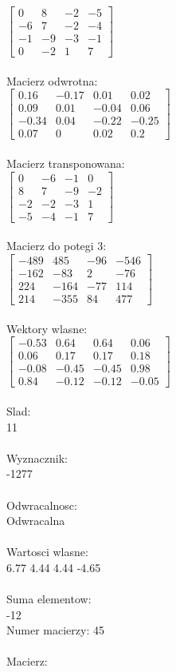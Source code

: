 \documentclass[a4paper,12pt]{article}
\begin{document}
$\begin{bmatrix} 0&8&-2&-5\\-6&7&-2&-4\\-1&-9&-3&-1\\0&-2&1&7 \end{bmatrix}$
\\
\\
Macierz odwrotna:\\

$\begin{bmatrix} 0.16&-0.17&0.01&0.02\\0.09&0.01&-0.04&0.06\\-0.34&0.04&-0.22&-0.25\\0.07&0&0.02&0.2 \end{bmatrix}$
\\
\\
Macierz transponowana:\\

$\begin{bmatrix} 0&-6&-1&0\\8&7&-9&-2\\-2&-2&-3&1\\-5&-4&-1&7 \end{bmatrix}$
\\
\\
Macierz do potegi 3:\\

$\begin{bmatrix} -489&485&-96&-546\\-162&-83&2&-76\\224&-164&-77&114\\214&-355&84&477 \end{bmatrix}$
\\
\\
Wektory wlasne:\\

$\begin{bmatrix} -0.53&0.64&0.64&0.06\\0.06&0.17&0.17&0.18\\-0.08&-0.45&-0.45&0.98\\0.84&-0.12&-0.12&-0.05 \end{bmatrix}$
\\
\\
Slad:\\
11
\\
\\
Wyznacznik:\\
-1277
\\
\\
Odwracalnosc:\\
Odwracalna
\\
\\
Wartosci wlasne:\\
6.77 4.44 4.44 -4.65
\\
\\
Suma elementow:\\
-12
\\
\newpage
Numer macierzy:
45
\\
\\
Macierz:\\
\end{document}
